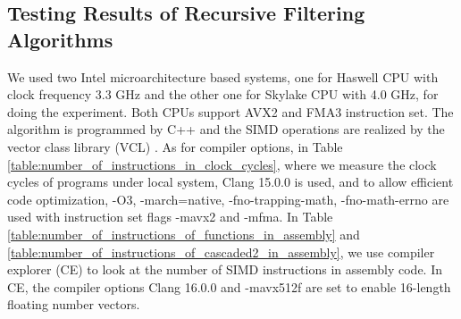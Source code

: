 \subsection{Testing Results of Recursive Filtering Algorithms}

We used two Intel microarchitecture based systems, one for Haswell CPU with clock frequency 3.3 GHz and
the other one for Skylake CPU with 4.0 GHz, for doing the experiment. Both CPUs support AVX2 and FMA3
instruction set. The algorithm is programmed by C++ and the SIMD operations are realized
by the vector class library (VCL) \cite{Agner_04}. 
As for compiler options, in Table \ref{table:number_of_instructions_in_clock_cycles}, where
we measure the clock cycles of programs under local system,
Clang 15.0.0 is used, and to allow efficient code optimization,
-O3, -march=native, -fno-trapping-math, -fno-math-errno
are used with instruction set flags -mavx2 and -mfma. 
In Table \ref{table:number_of_instructions_of_functions_in_assembly} and \ref{table:number_of_instructions_of_cascaded2_in_assembly},
we use compiler explorer (CE) \cite{Matt_12} to 
look at the number of SIMD instructions in assembly code.
In CE, the compiler options Clang 16.0.0 and -mavx512f are set to enable 16-length floating number vectors. 





